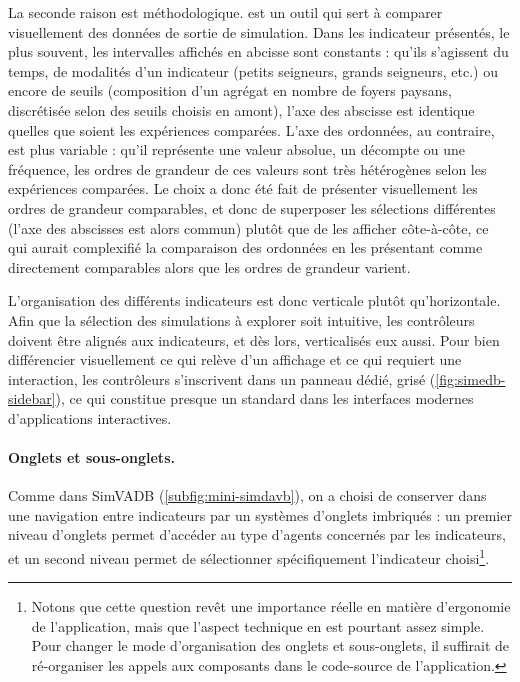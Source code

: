 La seconde raison est méthodologique.
\simedb{} est un outil qui sert à comparer visuellement des données de sortie de simulation.
Dans les indicateur présentés, le plus souvent, les intervalles affichés en abcisse sont constants : qu'ils s'agissent du temps, de modalités d'un indicateur (petits seigneurs, grands seigneurs, etc.) ou encore de seuils (composition d'un agrégat en nombre de foyers paysans, discrétisée selon des seuils choisis en amont), l'axe des abscisse est identique quelles que soient les expériences comparées.
L'axe des ordonnées, au contraire, est plus variable : qu'il représente une valeur absolue, un décompte ou une fréquence, les ordres de grandeur de ces valeurs sont très hétérogènes selon les expériences comparées.
Le choix a donc été fait de présenter visuellement les ordres de grandeur comparables, et donc de superposer les sélections différentes (l'axe des abscisses est alors commun) plutôt que de les afficher côte-à-côte, ce qui aurait complexifié la comparaison des ordonnées en les présentant comme directement comparables alors que les ordres de grandeur varient.


L'organisation des différents indicateurs est donc verticale plutôt qu'horizontale.
Afin que la sélection des simulations à explorer soit intuitive, les contrôleurs doivent être alignés aux indicateurs, et dès lors, verticalisés eux aussi.
Pour bien différencier visuellement ce qui relève d'un affichage et ce qui requiert une interaction, les contrôleurs s'inscrivent dans un panneau dédié, grisé (\cref{fig:simedb-sidebar}), ce qui constitue presque un standard dans les interfaces modernes d'applications interactives.

\paragraph{Onglets et sous-onglets.}

Comme dans SimVADB (\cref{subfig:mini-simdavb}), on a choisi de conserver dans \simedb{} une navigation entre indicateurs par un systèmes d'onglets imbriqués : un premier niveau d'onglets permet d'accéder au type d'agents concernés par les indicateurs, et un second niveau permet de sélectionner spécifiquement l'indicateur choisi\footnote{
	Notons que cette question revêt une importance réelle en matière d'ergonomie de l'application, mais que l'aspect technique en est pourtant assez simple.
	Pour changer le mode d'organisation des onglets et sous-onglets, il suffirait de ré-organiser les appels aux composants dans le code-source de l'application.
}.

